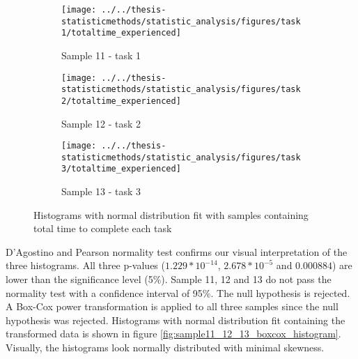  \begin{figure}[H]
 	\centering
	 \begin{subfigure}[b]{0.32\textwidth}
	 	\centering
	 	\texttt{[image: ../../thesis-statisticmethods/statistic\_analysis/figures/task1/totaltime\_experienced]}
	 	\caption{Sample 11 - task 1}
	 	\label{fig:totaltimeexperienced_task1}
	 \end{subfigure}
	 \begin{subfigure}[b]{0.32\textwidth}
	 	\centering
	 	\texttt{[image: ../../thesis-statisticmethods/statistic\_analysis/figures/task2/totaltime\_experienced]}
	 	\caption{Sample 12 - task 2}
	 	\label{fig:totaltimeexperienced_task2}
	 \end{subfigure}
	 \begin{subfigure}[b]{0.32\textwidth}
	 	\centering
	 	\texttt{[image: ../../thesis-statisticmethods/statistic\_analysis/figures/task3/totaltime\_experienced]}
	 	\caption{Sample 13 - task 3}
	 	\label{fig:totaltimeexperienced}
	 \end{subfigure}
 	\caption{Histograms with normal distribution fit with samples containing total time to complete each task}
 	\label{fig:sample11_12_13_histogram}
 \end{figure}
 
D'Agostino and Pearson normality test confirms our visual interpretation of the three histograms. All three p-values ($1.229 * 10^{-14}$, $2.678 * 10^{-5}$ and $0.000884$) are lower than the significance level (5\%). Sample 11, 12 and 13 do not pass the normality test with a confidence interval of 95\%. The null hypothesis is rejected. \\[0.2cm]

A Box-Cox power transformation is applied to all three samples since the null hypothesis was rejected. Histograms with normal distribution fit containing the transformed data is shown in figure \ref{fig:sample11_12_13_boxcox_histogram}. Visually, the histograms look normally distributed with minimal skewness. \\

